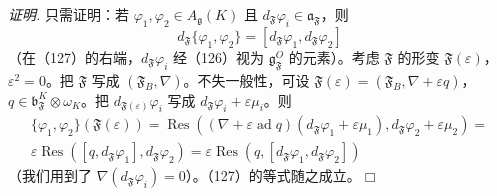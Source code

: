 \emph{证明.} 只需证明：若 $\varphi_1,\varphi_2\in A_{\mathfrak{g}}(K)$ 且 $d_{\mathfrak{F}}\varphi_i\in\mathfrak{a}_{\mathfrak{F}}$，则
\begin{equation}\tag{127}
d_{\mathfrak{F}}\{\varphi_1,\varphi_2\}=[d_{\mathfrak{F}}\varphi_1,d_{\mathfrak{F}}\varphi_2]
\end{equation}
（在（127）的右端，$d_{\mathfrak{F}}\varphi_i$ 经（126）视为 $\mathfrak{g}^O_{\mathfrak{F}}$ 的元素）。考虑 $\mathfrak{F}$ 的形变 $\mathfrak{F}(\varepsilon)$，$\varepsilon^2=0$。把 $\mathfrak{F}$ 写成 $(\mathfrak{F}_B,\nabla)$。不失一般性，可设 $\mathfrak{F}(\varepsilon)=(\mathfrak{F}_B,\nabla+\varepsilon q)$，$q\in\mathfrak{b}^K_{\mathfrak{F}}\otimes\omega_K$。把 $d_{\mathfrak{F}(\varepsilon)}\varphi_i$ 写成 $d_{\mathfrak{F}}\varphi_i+\varepsilon\mu_i$。则
\[
\begin{gathered}
\{\varphi_1,\varphi_2\}(\mathfrak{F}(\varepsilon))=\operatorname{Res}((\nabla+\varepsilon\operatorname{ad}q)(d_{\mathfrak{F}}\varphi_1+\varepsilon\mu_1),d_{\mathfrak{F}}\varphi_2+\varepsilon\mu_2)=\\
\varepsilon\operatorname{Res}([q,d_{\mathfrak{F}}\varphi_1],d_{\mathfrak{F}}\varphi_2)=\varepsilon\operatorname{Res}(q,[d_{\mathfrak{F}}\varphi_1,d_{\mathfrak{F}}\varphi_2])
\end{gathered}
\]
（我们用到了 $\nabla(d_{\mathfrak{F}}\varphi_i)=0$）。（127）的等式随之成立。\hfill$\Box$
